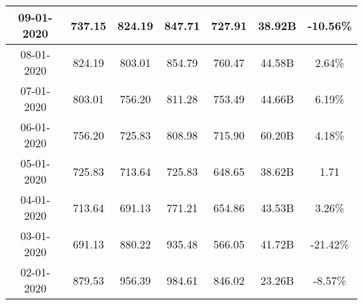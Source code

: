 \begin{table}[H]
{\begin{tabular}{|c|c|c|c|c|c|c|}
        09-01-2020 & 737.15 & 824.19 & 847.71 & 727.91 & 38.92B & -10.56\% \\ \hline
        08-01-2020 & 824.19 & 803.01 & 854.79 & 760.47 & 44.58B & 2.64\% \\ \hline
        07-01-2020 & 803.01 & 756.20 & 811.28 & 753.49 & 44.66B & 6.19\% \\ \hline
        06-01-2020 & 756.20 & 725.83 & 808.98 & 715.90 & 60.20B & 4.18\% \\ \hline
        05-01-2020 & 725.83 & 713.64 & 725.83 & 648.65 & 38.62B & 1.71\\
        \hline
         04-01-2020 & 713.64 & 691.13 & 771.21 & 654.86 & 43.53B & 3.26\% \\
         \hline
        03-01-2020 & 691.13 & 880.22 & 935.48 & 566.05 & 41.72B & -21.42\% \\
        \hline
        02-01-2020 & 879.53 & 956.39 & 984.61 & 846.02 & 23.26B & -8.57\% \\
        
        \bottomrule
    \end{tabular}
    }
\end{table}
\cite{LQ45_data}


